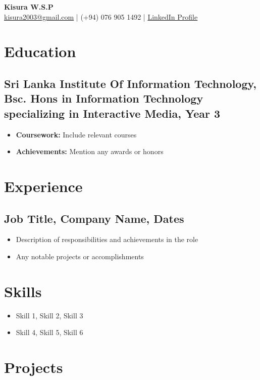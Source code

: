 \documentclass{article}
\begin{document}
\begin{center}
    \Large{\textbf{Kisura W.S.P}} \\
    \small{\href{mailto:kisura2003@gmail.com}{kisura2003@gmail.com} | (+94) 076 905 1492 | \href{https://www.linkedin.com/in/kisurawsp/}{LinkedIn Profile}}
\end{center}

\section*{Education}
\subsection*{Sri Lanka Institute Of Information Technology, Bsc. Hons in Information Technology specializing in Interactive Media, Year 3}
\begin{itemize}
    \item \textbf{Coursework:} Include relevant courses
    \item \textbf{Achievements:} Mention any awards or honors
\end{itemize}

\section*{Experience}
\subsection*{Job Title, Company Name, Dates}
\begin{itemize}
    \item Description of responsibilities and achievements in the role
    \item Any notable projects or accomplishments
\end{itemize}

\section*{Skills}
\begin{itemize}
    \item Skill 1, Skill 2, Skill 3
    \item Skill 4, Skill 5, Skill 6
\end{itemize}

\section*{Projects}
\end{document}
